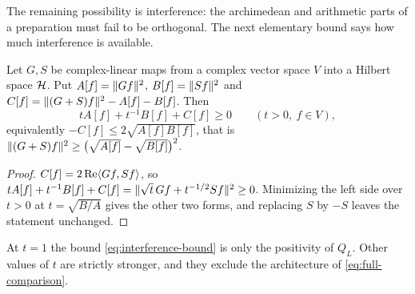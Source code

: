 The remaining possibility is interference: the archimedean and arithmetic
parts of a preparation must fail to be orthogonal. The next elementary bound
says how much interference is available.

\begin{lemma}\label{lem:interference}
Let $G,S$ be complex-linear maps from a complex vector space $V$ into a
Hilbert space $\mathcal H$. Put $A[f]=\lVert Gf\rVert^2$, $B[f]=\lVert Sf\rVert^2$ and
$C[f]=\lVert (G+S)f\rVert^2-A[f]-B[f]$. Then
\begin{equation}\label{eq:interference-bound}
 tA[f]+t^{-1}B[f]+C[f]\geq0\qquad (t>0,\ f\in V),
\end{equation}
equivalently $-C[f]\leq2\sqrt{A[f]B[f]}$, that is
$\lVert (G+S)f\rVert^2\geq\big(\sqrt{A[f]}-\sqrt{B[f]}\big)^2$.
\end{lemma}
\begin{proof}
$C[f]=2\operatorname{Re}\langle Gf,Sf\rangle$, so
$tA[f]+t^{-1}B[f]+C[f]=\lVert \sqrt t\,Gf+t^{-1/2}Sf\rVert^2\geq0$.
Minimizing the left side over $t>0$ at $t=\sqrt{B/A}$ gives the other two
forms, and replacing $S$ by $-S$ leaves the statement unchanged.
\end{proof}

At $t=1$ the bound \eqref{eq:interference-bound} is only the positivity of
$Q_L$. Other values of $t$ are strictly stronger, and they exclude the
architecture of \eqref{eq:full-comparison}.

